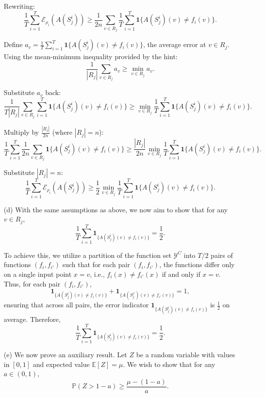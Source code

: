 \documentclass{article}
\begin{document}
\begin{itemize}
    Rewriting:
    \[
    \frac{1}{T} \sum_{i=1}^T \mathcal{E}_{\rho_i}(A(S_j^i)) \geq \frac{1}{2n} \sum_{v \in R_j} \frac{1}{T} \sum_{i=1}^T \mathbf{1}\{A(S_j^i)(v) \neq f_i(v)\}.
    \]
    
    Define \( a_v = \frac{1}{T} \sum_{i=1}^T \mathbf{1}\{A(S_j^i)(v) \neq f_i(v)\} \), the average error at \( v \in R_j \). Using the mean-minimum inequality provided by the hint:
    \[
    \frac{1}{|R_j|} \sum_{v \in R_j} a_v \geq \min_{v \in R_j} a_v.
    \]
    
    Substitute \( a_v \) back:
    \[
    \frac{1}{T |R_j|} \sum_{v \in R_j} \sum_{i=1}^T \mathbf{1}\{A(S_j^i)(v) \neq f_i(v)\} \geq \min_{v \in R_j} \frac{1}{T} \sum_{i=1}^T \mathbf{1}\{A(S_j^i)(v) \neq f_i(v)\}.
    \]
    
    Multiply by \( \frac{|R_j|}{2n} \) (where \( |R_j| = n \)):
    \[
    \frac{1}{T} \sum_{i=1}^T \frac{1}{2n} \sum_{v \in R_j} \mathbf{1}\{A(S_j^i)(v) \neq f_i(v)\} \geq \frac{|R_j|}{2n} \min_{v \in R_j} \frac{1}{T} \sum_{i=1}^T \mathbf{1}\{A(S_j^i)(v) \neq f_i(v)\}.
    \]
    
    Substitute \( |R_j| = n \):
    \[
    \frac{1}{T} \sum_{i=1}^T \mathcal{E}_{\rho_i}(A(S_j^i)) \geq \frac{1}{2} \min_{v \in R_j} \frac{1}{T} \sum_{i=1}^T \mathbf{1}\{A(S_j^i)(v) \neq f_i(v)\}.
    \]

    \item[(d)] With the same assumptions as above, we now aim to show that for any \( v \in R_j \),
    \[
    \frac{1}{T} \sum_{i=1}^T \mathbf{1}_{\{A(S_j^i)(v) \neq f_i(v)\}} = \frac{1}{2}.
    \]
    
    To achieve this, we utilize a partition of the function set \( \mathcal{Y}^C \) into \( T/2 \) pairs of functions \( (f_i, f_{i'}) \) such that for each pair \( (f_i, f_{i'}) \), the functions differ only on a single input point \( x = v \), i.e., \( f_i(x) \neq f_{i'}(x) \) if and only if \( x = v \). Thus, for each pair \( (f_i, f_{i'}) \),
    \[
    \mathbf{1}_{\{A(S_j^i)(v) \neq f_i(v)\}} + \mathbf{1}_{\{A(S_j^{i'})(v) \neq f_{i'}(v)\}} = 1,
    \]
    ensuring that across all pairs, the error indicator \( \mathbf{1}_{\{A(S_j^i)(v) \neq f_i(v)\}} \) is \( \frac{1}{2} \) on average. Therefore,
    \[
    \frac{1}{T} \sum_{i=1}^T \mathbf{1}_{\{A(S_j^i)(v) \neq f_i(v)\}} = \frac{1}{2}.
    \]

    \item[(e)] We now prove an auxiliary result. Let \( Z \) be a random variable with values in \( [0, 1] \) and expected value \( \mathbb{E}[Z] = \mu \). We wish to show that for any \( a \in (0, 1) \),
    \[
    \mathbb{P}(Z > 1 - a) \ge \frac{\mu - (1 - a)}{a}.
    \]
    

\end{itemize}
\end{document}
